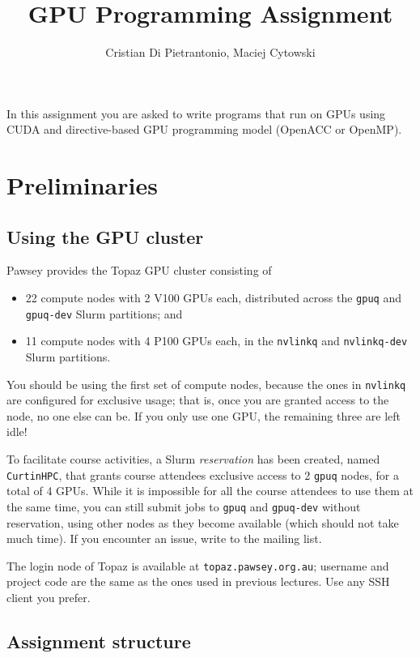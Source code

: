 \documentclass[a4paper, 11pt]{article}
\title{GPU Programming Assignment}
\author{Cristian Di Pietrantonio, Maciej Cytowski}
\begin{document}
	\maketitle
	
	In this assignment you are asked to write programs that run on GPUs using CUDA and directive-based GPU programming model (OpenACC or OpenMP). 
	\section{Preliminaries}
	\subsection{Using the GPU cluster}
	Pawsey provides the Topaz GPU cluster consisting of
	\begin{itemize}
		\item 22 compute nodes with 2 V100 GPUs each, distributed across the \texttt{gpuq} and \texttt{gpuq-dev} Slurm partitions; and
		\item 11 compute nodes with 4 P100 GPUs each, in the \texttt{nvlinkq} and \texttt{nvlinkq-dev} Slurm partitions.
	\end{itemize}
	
	You should be using the first set of compute nodes, because the ones in \texttt{nvlinkq} are configured for exclusive usage; that is, once you are granted access to the node, no one else can be. If you only use one GPU, the remaining three are left idle!
	
	To facilitate course activities, a Slurm \textit{reservation} has been created, named \texttt{CurtinHPC}, that grants course attendees exclusive access to 2 \texttt{gpuq} nodes, for a total of 4 GPUs. While it is impossible for all the course attendees to use them at the same time, you can still submit jobs to \texttt{gpuq} and \texttt{gpuq-dev} without reservation, using other nodes as they become available (which should not take much time). If you encounter an issue, write to the mailing list.
	
	The login node of Topaz is available at \texttt{topaz.pawsey.org.au}; username and project code are the same as the ones used in previous lectures. Use any SSH client you prefer.
	
	\subsection{Assignment structure}
	
\end{document}

